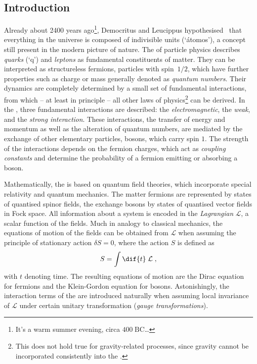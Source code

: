 \subsection{Introduction}
Already about 2400 years ago\footnote{It's a warm summer evening, circa $400\;\text{BC}$\ldots}, Democritus and Leucippus hypothesised~\cite{bib:Stoerig:Philosophie} that everything in the universe is composed of indivisible units (`\'{a}tomos'), a concept still present in the modern picture of nature.
The \sm of particle physics describes \emph{quarks} (`q') and \emph{leptons} as fundamental constituents of matter.
They can be interpreted as structureless fermions, \ie particles with spin~$1/2$, which have further properties such as charge or mass generally denoted as \emph{quantum numbers}.
Their dynamics are completely determined by a small set of fundamental interactions, from which -- at least in principle -- all other laws of physics\footnote{This does not hold true for gravity-related processes, since gravity cannot be incorporated consistently into the \sm.} can be derived.
In the \sm, three fundamental interactions are described: the \emph{electromagnetic}, the \emph{weak}, and the \emph{strong interaction}.
These interactions, \ie the transfer of energy and momentum as well as the alteration of quantum numbers, are mediated by the exchange of other elementary particles, bosons, which carry spin $1$.
The strength of the interactions depends on the fermion charges, which act as \emph{coupling constants} and determine the probability of a fermion emitting or absorbing a boson.

Mathematically, the \sm is based on quantum field theories, which incorporate special relativity and quantum mechanics.
The matter fermions are represented by states of quantised spinor fields, the exchange bosons by states of quantised vector fields in Fock space.
All information about a system is encoded in the \emph{Lagrangian} $\mathcal{L}$, a scalar function of the fields.
Much in analogy to classical mechanics, the equations of motion of the fields can be obtained from $\mathcal{L}$ when assuming the principle of stationary action \mbox{$\delta S = 0$}, where the action $S$ is defined as
\begin{equation*}
  S = \int\dif{t}\;\mathcal{L} \;,
\end{equation*}
with $t$ denoting time.
The resulting equations of motion are the Dirac equation for fermions and the Klein-Gordon equation for bosons.
Astonishingly, the interaction terms of the \sm are introduced naturally when assuming local invariance of $\mathcal{L}$ under certain unitary transformation (\emph{gauge transformations}).

